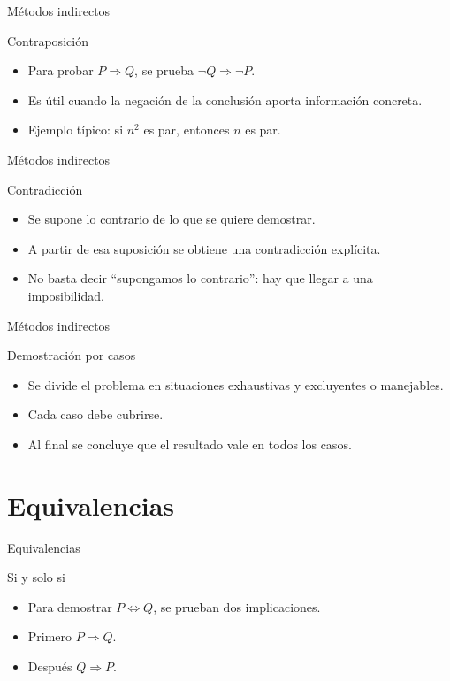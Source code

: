 \documentclass[aspectratio=169,11pt]{beamer}
\begin{document}
\begin{frame}{Métodos indirectos}
\begin{block}{Contraposición}
\begin{itemize}
  \item Para probar \(P\Rightarrow Q\), se prueba \(\neg Q\Rightarrow\neg P\).
  \item Es útil cuando la negación de la conclusión aporta información concreta.
  \item Ejemplo típico: si \(n^2\) es par, entonces \(n\) es par.
\end{itemize}
\end{block}
\end{frame}

\begin{frame}{Métodos indirectos}
\begin{block}{Contradicción}
\begin{itemize}
  \item Se supone lo contrario de lo que se quiere demostrar.
  \item A partir de esa suposición se obtiene una contradicción explícita.
  \item No basta decir ``supongamos lo contrario'': hay que llegar a una imposibilidad.
\end{itemize}
\end{block}
\end{frame}

\begin{frame}{Métodos indirectos}
\begin{block}{Demostración por casos}
\begin{itemize}
  \item Se divide el problema en situaciones exhaustivas y excluyentes o manejables.
  \item Cada caso debe cubrirse.
  \item Al final se concluye que el resultado vale en todos los casos.
\end{itemize}
\end{block}
\end{frame}

\section{Equivalencias}

\begin{frame}{Equivalencias}
\begin{block}{Si y solo si}
\begin{itemize}
  \item Para demostrar \(P\Leftrightarrow Q\), se prueban dos implicaciones.
  \item Primero \(P\Rightarrow Q\).
  \item Después \(Q\Rightarrow P\).
\end{itemize}
\end{block}
\end{frame}
\end{document}
